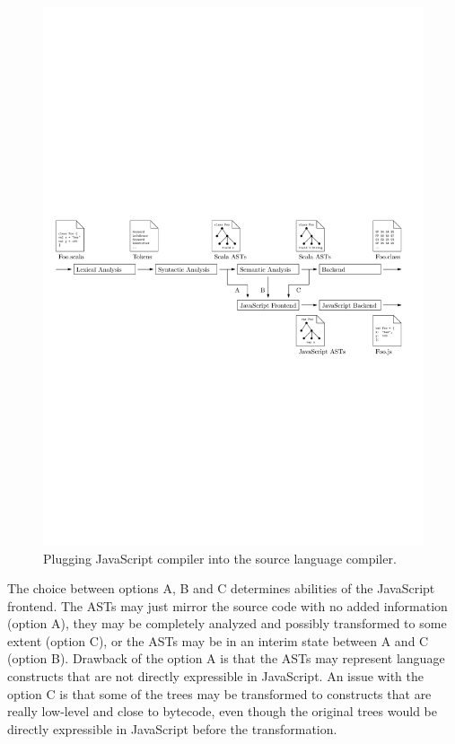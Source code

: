\documentclass[12pt,a4paper]{report}
\begin{document}
\begin{figure}[ht]
  \centering
	\includegraphics[width=\linewidth,height=\textheight,keepaspectratio]{img/CompilerComplete.pdf}
	\caption{Plugging JavaScript compiler into the source language compiler.}
	\label{CompilerComplete}
\end{figure}

The choice between options A, B and C determines abilities of the JavaScript frontend. The ASTs may just mirror the source code with no added information (option A), they may be completely analyzed and possibly transformed to some extent (option C), or the ASTs may be in an interim state between A and C (option B). Drawback of the option A is that the ASTs may represent language constructs that are not directly expressible in JavaScript. An issue with the option C is that some of the trees may be transformed to constructs that are really low-level and close to bytecode, even though the original trees would be directly expressible in JavaScript before the transformation.
\end{document}
